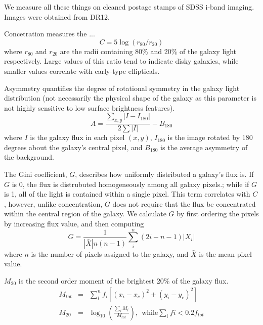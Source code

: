\documentclass[twocolumn]{aastex6}
\newcommand{\rr}[1]{$r_{#1}$}
\newcommand{\M}[1]{$M_{#1}$}
\begin{document}
We measure all these things on cleaned postage stamps of SDSS i-band imaging. 
Images were obtained from DR12. 


Concetration measures the ... 
\begin{equation}
C = 5\log(r_{80}/ r_{20})
\end{equation}
where \rr{80} and \rr{20} are the radii containing 80\% and 20\% of the galaxy light respectively.  Large values of this ratio tend to indicate disky galaxies, while smaller values correlate with early-type ellipticals. 

Asymmetry quantifies the degree of rotational symmetry in the galaxy light distribution (not necessarily the physical shape of the galaxy as this parameter is not highly sensitive to low surface brightness features).  
\begin{equation}
A = \frac{\sum_{x,y} |I - I_{180}|}{ 2\sum|I|} - B_{180}
\end{equation}
where $I$ is the galaxy flux in each pixel $(x, y)$, $I_{180}$ is the image rotated by 180 degrees about the galaxy's central pixel, and $B_{180}$ is the average asymmetry of the background. 

The Gini coefficient, $G$, describes how uniformly distributed a galaxy's flux is.  If $G$ is 0, the flux is distrubuted homogeneously among all galaxy pixels.; while if $G$ is 1,  all of the light is contained within a single pixel. This term correlates with $C$, however, unlike concentration, $G$ does not require that the flux be concentrated within the central region of the galaxy.  We calculate $G$ by first ordering the pixels by increasing flux value, and then computing
\begin{equation}
G = \frac{1}{|\bar X|n(n-1)}\sum_i^n(2i-n-1)|X_i|
\end{equation}
where $n$ is the number of pixels assigned to the galaxy, and $\bar X$ is the mean pixel value. 

\M{20} is the second order moment of the brightest 20\% of the galaxy flux. 
\begin{eqnarray}
 M_{tot} & = & \sum_i^nf_i[(x_i-x_c)^2 + (y_i-y_c)^2]  \\
 M_{20} & = & \log_{10} (\frac{\sum_iM_i}{M_{tot}}), ~~\textrm{while} \sum_ifi < 0.2f_{tot}
\end{eqnarray}
\end{document}
